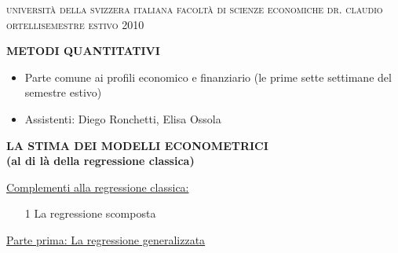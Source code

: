 \documentclass[a4paper,12pt]{article}
\begin{document}
{\small \textsc{universit\`{a} della svizzera italiana}}\hfill {\small 
\textsc{facolt\`{a} di scienze economiche}}\newline
{\small \textsc{dr. claudio ortelli}}\hfill {\small \textsc{semestre estivo
2010}}

\vspace{0.4cm}

\begin{center}
\textbf{\large METODI QUANTITATIVI}
\end{center}

\vspace{0.1cm}

\begin{itemize}
\item Parte comune ai profili economico e finanziario (le prime sette
settimane del semestre estivo)

\item Assistenti: Diego Ronchetti, Elisa Ossola
\end{itemize}

\begin{center}
\vspace{0.4cm}

\textbf{\large LA STIMA DEI MODELLI ECONOMETRICI} \\[0pt]
\textbf{{\large (al di l\`{a} della regressione classica)}}
\end{center}

\vspace{1cm}

\underline{Complementi alla regressione classica:}

\begin{enumerate}
\item[1] La regressione scomposta
\end{enumerate}

\noindent \underline{Parte prima: La regressione generalizzata}
\end{document}
